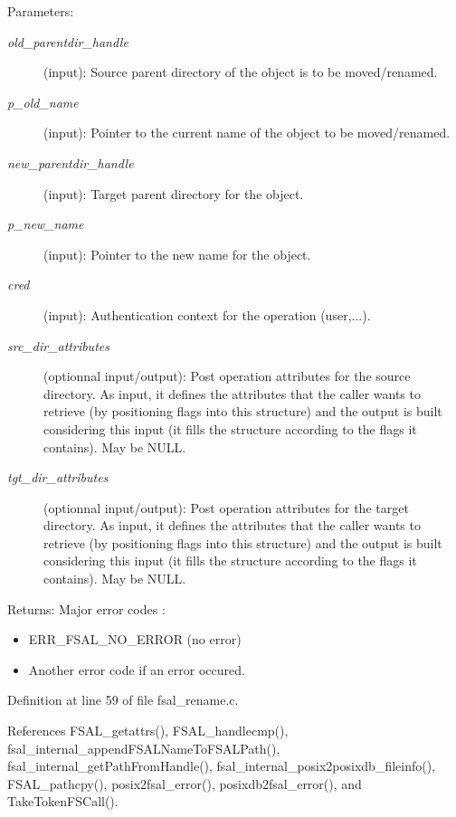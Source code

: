 \begin{Desc}
\item[Parameters:]
\begin{description}
\item[{\em old\_\-parentdir\_\-handle}](input): Source parent directory of the object is to be moved/renamed. \item[{\em p\_\-old\_\-name}](input): Pointer to the current name of the object to be moved/renamed. \item[{\em new\_\-parentdir\_\-handle}](input): Target parent directory for the object. \item[{\em p\_\-new\_\-name}](input): Pointer to the new name for the object. \item[{\em cred}](input): Authentication context for the operation (user,...). \item[{\em src\_\-dir\_\-attributes}](optionnal input/output): Post operation attributes for the source directory. As input, it defines the attributes that the caller wants to retrieve (by positioning flags into this structure) and the output is built considering this input (it fills the structure according to the flags it contains). May be NULL. \item[{\em tgt\_\-dir\_\-attributes}](optionnal input/output): Post operation attributes for the target directory. As input, it defines the attributes that the caller wants to retrieve (by positioning flags into this structure) and the output is built considering this input (it fills the structure according to the flags it contains). May be NULL.\end{description}
\end{Desc}
\begin{Desc}
\item[Returns:]Major error codes :\begin{itemize}
\item ERR\_\-FSAL\_\-NO\_\-ERROR (no error)\item Another error code if an error occured. \end{itemize}
\end{Desc}


Definition at line 59 of file fsal\_\-rename.c.

References FSAL\_\-getattrs(), FSAL\_\-handlecmp(), fsal\_\-internal\_\-append\-FSALName\-To\-FSALPath(), fsal\_\-internal\_\-get\-Path\-From\-Handle(), fsal\_\-internal\_\-posix2posixdb\_\-fileinfo(), FSAL\_\-pathcpy(), posix2fsal\_\-error(), posixdb2fsal\_\-error(), and Take\-Token\-FSCall().